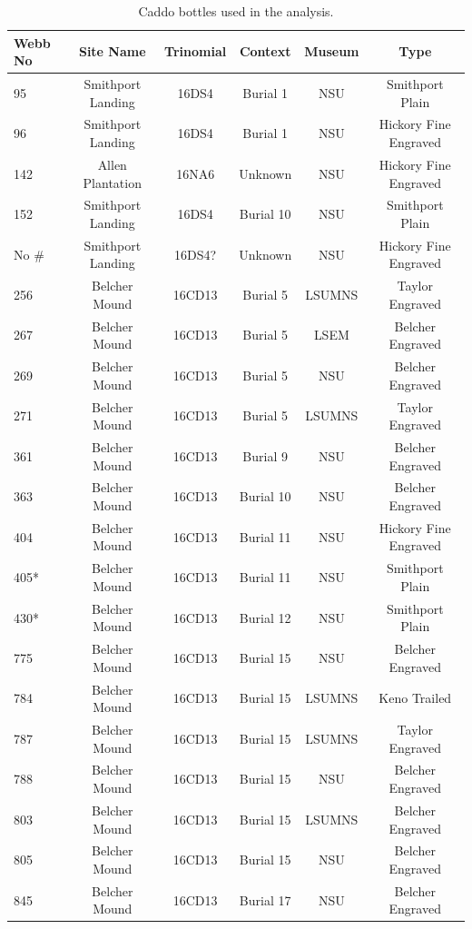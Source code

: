 \documentclass[review]{elsarticle}
\begin{document}
\begin{table}[htbp]\centering
\footnotesize
\caption{Caddo bottles used in the analysis.}
\centering
\begin{tabular}{lccccc}
\toprule
Webb No & Site Name & Trinomial & Context & Museum & Type\\
\midrule
95 & Smithport Landing & 16DS4 & Burial 1 & NSU & Smithport Plain\\
96 & Smithport Landing & 16DS4 & Burial 1 & NSU & Hickory Fine Engraved\\
142 & Allen Plantation & 16NA6 & Unknown & NSU & Hickory Fine Engraved\\
152 & Smithport Landing & 16DS4 & Burial 10 & NSU & Smithport Plain\\
No \# & Smithport Landing & 16DS4? & Unknown & NSU & Hickory Fine Engraved\\
256 & Belcher Mound & 16CD13 & Burial 5 & LSUMNS & Taylor Engraved\\
267 & Belcher Mound & 16CD13 & Burial 5 & LSEM & Belcher Engraved\\
269 & Belcher Mound & 16CD13 & Burial 5 & NSU & Belcher Engraved\\
271 & Belcher Mound & 16CD13 & Burial 5 & LSUMNS & Taylor Engraved\\
361 & Belcher Mound & 16CD13 & Burial 9 & NSU & Belcher Engraved\\
363 & Belcher Mound & 16CD13 & Burial 10 & NSU & Belcher Engraved\\
404 & Belcher Mound & 16CD13 & Burial 11 & NSU & Hickory Fine Engraved\\
405* & Belcher Mound & 16CD13 & Burial 11 & NSU & Smithport Plain\\
430* & Belcher Mound & 16CD13 & Burial 12 & NSU & Smithport Plain\\
775 & Belcher Mound & 16CD13 & Burial 15 & NSU & Belcher Engraved\\
784 & Belcher Mound & 16CD13 & Burial 15 & LSUMNS & Keno Trailed\\
787 & Belcher Mound & 16CD13 & Burial 15 & LSUMNS & Taylor Engraved\\
788 & Belcher Mound & 16CD13 & Burial 15 & NSU & Belcher Engraved\\
803 & Belcher Mound & 16CD13 & Burial 15 & LSUMNS & Belcher Engraved\\
805 & Belcher Mound & 16CD13 & Burial 15 & NSU & Belcher Engraved\\
845 & Belcher Mound & 16CD13 & Burial 17 & NSU & Belcher Engraved\\

\end{tabular}
\end{table}
\end{document}

